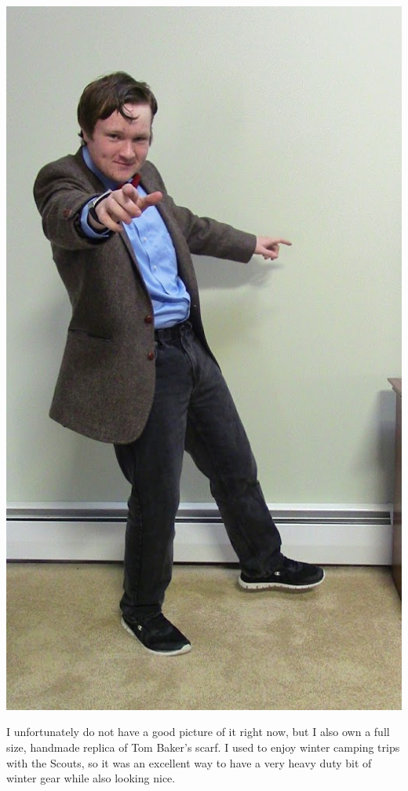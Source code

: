 \documentclass[letterpaper, 10pt,DIV=13]{scrartcl}
\numberwithin{equation}{section} %
\numberwithin{figure}{section} %
\numberwithin{table}{section} %
\begin{document}
\begin{center}
    \includegraphics[scale=.35]{IMG_1895.jpg}
\end{center}

I unfortunately do not have a good picture of it right now, but I also own a full size, handmade replica of Tom Baker's scarf. I used to enjoy winter camping trips with the Scouts, so it was an excellent way to have a very heavy duty bit of winter gear while also looking nice.
\end{document}
